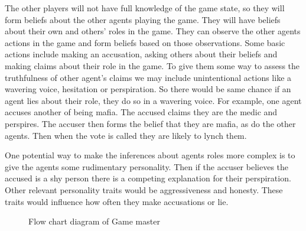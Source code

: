 \documentclass[12pt]{article} %
\begin{document}
The other players will not have full knowledge of the game state, so they will form beliefs about the other agents playing the game. They will have beliefs about their own and others’ roles in the game. They can observe the other agents actions in the game and form beliefs based on those observations. Some basic actions include making an accusation, asking others about their beliefs and making claims about their role in the game. To give them some way to assess the truthfulness of other agent’s claims we may include unintentional actions like a wavering voice, hesitation or perspiration. So there would be same chance if an agent lies about their role, they do so in a wavering voice. For example, one agent accuses another of being mafia. The accused claims they are the medic and perspires. The accuser then forms the belief that they are mafia, as do the other agents. Then when the vote is called they are likely to lynch them. 

One potential way to make the inferences about agents roles more complex is to give the agents some rudimentary personality. Then if the accuser believes the accused is a shy person there is a competing explanation for their perspiration. Other relevant personality traits would be aggressiveness and honesty. These traits would influence how often they make accusations or lie. 




\begin{figure}[H] 
\caption{Flow chart diagram of Game master}
\end{figure}
\end{document}
